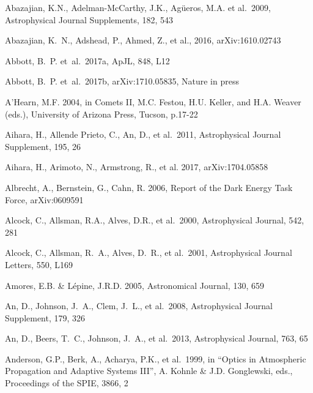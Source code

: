 \documentclass[twocolumn]{aastex61}
\begin{document}
\vskip 0.3in
\begin{thebibliography}{}

 Abazajian, K.N., Adelman-McCarthy, J.K., Ag\"ueros, M.A. et al.~2009, Astrophysical Journal Supplements, 182, 543

 Abazajian, K.~N., Adshead, P., Ahmed, Z., et al., 2016, arXiv:1610.02743

 Abbott, B.~P. et~al.~2017a, ApJL, 848, L12

 Abbott, B.~P. et~al.~2017b, arXiv:1710.05835, Nature in press

 A'Hearn, M.F. 2004, in Comets II, M.C. Festou, H.U. Keller, and H.A. Weaver (eds.), University of  Arizona Press, Tucson, p.17-22

 Aihara, H., Allende Prieto, C., An, D., et al.~2011, Astrophysical Journal Supplement, 195, 26

 Aihara, H.,  Arimoto, N., Armstrong, R., et al. 2017, arXiv:1704.05858


 Albrecht, A., Bernstein, G., Cahn, R. 2006, Report of the Dark Energy Task Force, arXiv:0609591

 Alcock, C., Allsman, R.A., Alves, D.R., et al.~2000, Astrophysical Journal, 542, 281

 Alcock, C., Allsman, R.~A., Alves, D.~R., et al.\ 2001, Astrophysical Journal Letters, 550, L169

 Amores, E.B. \& L\'{e}pine, J.R.D. 2005, Astronomical Journal, 130, 659

 An, D., Johnson, J.~A., Clem, J.~L., et al.~2008, Astrophysical Journal Supplement, 179, 326

 An, D., Beers, T.~C., Johnson, J.~A., et al.~2013, Astrophysical Journal, 763, 65

 Anderson, G.P., Berk, A., Acharya, P.K., et al.~1999, in ``Optics in Atmospheric Propagation and Adaptive Systems III'',  A. Kohnle \& J.D. Gonglewski, eds., Proceedings of the SPIE, 3866, 2


\end{thebibliography}
\end{document}
